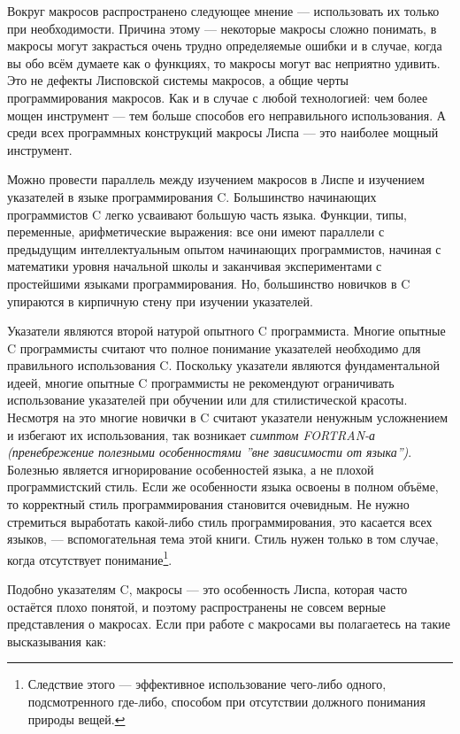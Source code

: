Вокруг макросов распространено следующее мнение --- использовать их только при необходимости. Причина этому --- некоторые макросы сложно понимать, в макросы могут закрасться очень трудно оп\-ре\-де\-ляемые ошибки и в случае, когда вы обо всём думаете как о функциях, то макросы могут вас неприятно удивить. Это не дефекты Лисповской системы макросов, а общие черты программирования макросов. Как и в случае с любой технологией: чем более мощен инструмент --- тем больше способов его неправильного использования. А среди всех программных конструкций макросы Лиспа --- это наиболее мощный инструмент.

Можно провести параллель между изучением макросов в Лиспе и изучением указателей в языке программирования C. Большинство на\-чи\-наю\-щих программистов C легко усваивают большую часть языка. Фун\-к\-ции, типы, переменные, арифметические выражения: все они имеют параллели с предыдущим интеллектуальным опытом начинающих прог\-рам\-мис\-тов, начиная с математики уровня начальной школы и за\-кан\-чивая экспериментами с простейшими языками программирования. Но, большинство новичков в C упираются в кирпичную стену при изучении указателей.

Указатели являются второй натурой опытного C программиста. Мно\-гие опытные C программисты считают что полное понимание указателей необходимо для правильного использования C. Поскольку указатели яв\-ляю\-тся фундаментальной идеей, многие опытные C программисты не рекомендуют ограничивать использование указателей при обучении или для стилистической красоты. Несмотря на это многие новички в C считают указатели ненужным усложнением и избегают их ис\-поль\-зо\-ва\-ния, так возникает \emph{симптом FORTRAN-а (пренебрежение полезными особенностями ''вне за\-ви\-си\-мос\-ти от я\-зы\-ка'')}. Бо\-лез\-нью является иг\-но\-ри\-ро\-ва\-ние особенностей языка, а не плохой программистский стиль. Если же особенности языка освоены в полном объёме, то корректный стиль программирования становится очевидным. Не нужно стремиться выработать какой-либо стиль программирования, это касается всех я\-зы\-ков, --- вспомогательная тема этой книги. Стиль нужен только в том случае, когда отсутствует понимание\footnote{Следствие этого --- эффективное использование чего-ли\-бо од\-но\-го, подсмотренного где-либо, способом при отсутствии должного понимания природы вещей.}.

Подобно указателям C, макросы --- это особенность Лиспа, которая часто остаётся плохо понятой, и поэтому распространены не совсем вер\-ные представления о макросах. Если при работе с макросами вы по\-ла\-гаетесь на такие высказывания как:

